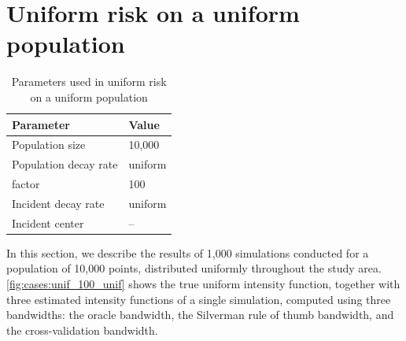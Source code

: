 \section{Uniform risk on a uniform population}
\label{sec:results:unif_100_unif}

\begin{table}[htbp]
\centering
\begin{tabular}{ll}
\hline
Parameter & Value \\
\hline
Population size & 10,000 \\
Population decay rate & uniform \\
\Gls{factor} & 100 \\
Incident decay rate & uniform \\
Incident center & -- \\
\hline
\end{tabular}
\caption{Parameters used in uniform risk on a uniform population}
\label{tab:params:unif_100_unif}
\end{table}

In this section, we describe the results of 1,000 simulations conducted for a population of 10,000 points,
distributed uniformly throughout the study area.
\autoref{fig:cases:unif_100_unif} shows the true uniform intensity function,
together with three estimated intensity functions of a single simulation,
computed using three bandwidths: the oracle bandwidth, the Silverman rule of thumb bandwidth,
and the cross-validation bandwidth.

